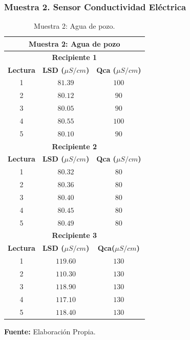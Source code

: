 \subsubsection{Muestra 2. Sensor Conductividad El\'ectrica }
    \begin{table}[H]
        \protect\caption[Muestra 2: Agua de pozo ]{Muestra 2: Agua de pozo.}
        \label{tab:CEMuestra2}
        \centering
        \begin{tabular}{c c c }
            \hline
            \multicolumn{3}{c}{\textbf{Muestra 2: Agua de pozo}} \\
             \hline
            \multicolumn{3}{c}{\textbf{Recipiente 1}} \\
            \hline
            \textbf{Lectura}&\textbf{LSD ($\mu S/cm$)}&\textbf{Qca ($\mu S/cm$)} \\
            \hline
            {1}& $81.39$&$100$ \\ 
            {2}& $80.12$&$90$ \\ 
            {3}&$80.05$&$90$\\  
            {4}& $80.55$&$100$\\ 
            {5}& $80.10$&$90$ \\
            \hline
                       \multicolumn{3}{c}{\textbf{Recipiente 2}} \\
            \hline
            \textbf{Lectura}&\textbf{LSD ($\mu S/cm$)}&\textbf{Qca ($\mu S/cm$)} \\
            \hline
            {1}& $80.32$&$80$ \\ 
            {2}& $80.36$&$80$ \\ 
            {3}&$80.40$&$80$  \\  
            {4}& $80.45$&$80$ \\ 
            {5}& $80.49$&$80$ \\ 
            \hline
            \multicolumn{3}{c}{\textbf{Recipiente 3}} \\
            \hline
            \textbf{Lectura}&\textbf{LSD ($\mu S/cm$)}&\textbf{Qca($\mu S/cm$)} \\
            \hline
            {1}& $119.60$&$130$ \\ 
            {2}& $110.30$&$130$ \\ 
            {3}&$118.90$&$130$  \\  
            {4}& $117.10$&$130$ \\ 
            {5}& $118.40$&$130$ \\ 
            \hline
        \end{tabular}
        \vspace{5mm}
        \newline
        \hfill \textbf{Fuente: }Elaboración Propia.
    \end{table}


